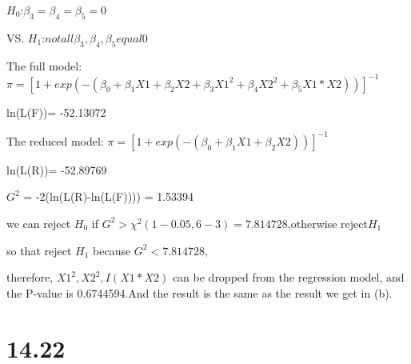 \documentclass{article}\usepackage[]{graphicx}\usepackage[]{color}
\begin{document}
\begin{enumerate}[(a)]
\begin{center}
$H_0$:$\beta_3=\beta_4=\beta_5=0$

VS. $H_1$:$not all \beta_3,\beta_4,\beta_5 equal 0$

The full model: $\pi = [1 + exp(-(\beta_0 + \beta_1 X1 + \beta_2 X2 + \beta_3 X1^2 + \beta_4 X2^2 + \beta_5 X1*X2))]^{-1} $

ln(L(F))= -52.13072

The reduced model: $\pi = [1 + exp(-(\beta_0 + \beta_1 X1 + \beta_2 X2))]^{-1} $

ln(L(R))= -52.89769

$G^2$ = -2(ln(L(R)-ln(L(F)))) = 1.53394

we can reject $H_0$ if $G^2 > \chi^2(1-0.05, 6-3)=7.814728$,otherwise reject$H_1$

so that reject $H_1$ because $G^2 < 7.814728$,

therefore, $X1^2,X2^2,I(X1*X2)$ can be dropped from the regression model, and the P-value is 0.6744594.And the result is the same as the result we get in (b).
\end{center}

\end{enumerate}

\section{14.22}
\end{document}
